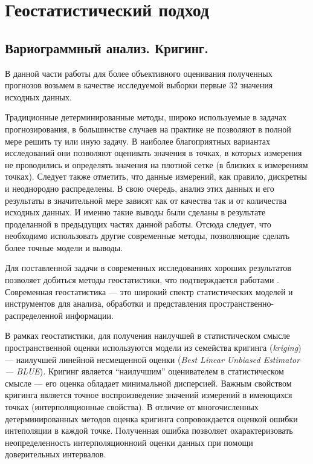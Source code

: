 

\section{Геостатистический подход} %
\label{sec:geostatistic}


\subsection{Вариограммный анализ. Кригинг.} %
\label{sec:_variogram}

В данной части работы для более объективного оценивания полученных прогнозов возьмем в качестве исследуемой выборки первые $32$ значения исходных данных.

Традиционные детерминированные методы, широко используемые в задачах прогнозирования, в большинстве случаев на практике не позволяют в полной мере решить ту или иную задачу. В наиболее благоприятных вариантах исследований они позволяют оценивать значения в точках, в которых измерения не проводились и определять значения на плотной сетке (в близких к измерениям точках). Следует также отметить, что данные измерений, как правило, дискретны и неоднородно распределены. В свою очередь, анализ этих данных и его результаты в значительной мере зависят как от качества так и от количества исходных данных. И именно такие выводы были сделаны в результате проделанной в предыдущих частях данной работы. Отсюда следует, что необходимо использовать другие современные методы, позволяющие сделать более точные модели и выводы.

Для поставленной задачи в современных исследованиях хороших результатов позволяет добиться методы геостатистики, что подтверждается работами \cite{GeoStCompar1987, GeoStCompar1998}. Современная геостатистика --- это широкий спектр статистических моделей и инструментов для анализа, обработки и представления пространственно-распределенной информации.

В рамках геостатистики, для получения наилучшей в статистическом смысле пространственной оценки используются модели из семейства кригинга (\textit{kriging}) --- наилучшей линейной несмещенной оценки (\textit{Best Linear Unbiased Estimator --- BLUE}). Кригинг является ``наилучшим'' оценивателем в статистическом смысле --- его оценка обладает минимальной дисперсией. Важным свойством кригинга является точное воспроизведение значений измерений в имеющихся точках (интерполяционные свойства). В отличие от многочисленных детерминированных методов оценка кригинга сопровождается оценкой ошибки интеполяции в каждой точке. Полученная ошибка позволяет охарактеризовать неопределенность интерполяционноий оценки данных при помощи доверительных интервалов.

